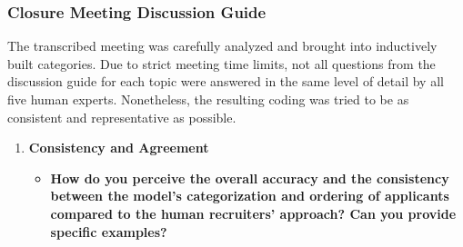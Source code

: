 \documentclass[draft,final]{thesisclass} %
\begin{document}
\subsubsection{Closure Meeting Discussion Guide} \label{closure_meeting_data}
The transcribed meeting was carefully analyzed and brought into inductively built categories. Due to strict meeting time limits, not all questions from the discussion guide for each topic were answered in the same level of detail by all five human experts. Nonetheless, the resulting coding was tried to be as consistent and representative as possible.
\begin{enumerate}
    \item \textbf{Consistency and Agreement}
    \begin{itemize}
        \item \textbf{How do you perceive the overall accuracy and the consistency between the model's categorization and ordering of applicants compared to the human recruiters' approach? Can you provide specific examples?}

\end{itemize}
\end{enumerate}
\end{document}
